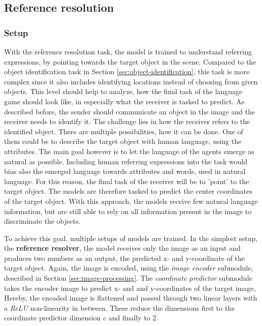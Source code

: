 \subsection{Reference resolution}
\label{sec:reference_resolution}
\subsubsection*{Setup}
With the reference resolution task, the model is trained to understand referring expressions, by pointing towards the target object in the scene.
Compared to the object identification task in Section \ref{sec:object-identification}, this task is more complex since it also includes identifying locations instead of choosing from given objects.
This level should help to analyze, how the final task of the language game should look like, in especially what the receiver is tasked to predict.
As described before, the sender should communicate an object in the image and the receiver needs to identify it.
The challenge lies in how the receiver refers to the identified object.
There are multiple possibilities, how it can be done.
One of them could be to describe the target object with human language, using the attributes.
The main goal however is to let the language of the agents emerge as natural as possible.
Including human referring expressions into the task would bias also the emerged language towards attributes and words, used in natural language.
For this reason, the final task of the receiver will be to 'point' to the target object.
The models are therefore tasked to predict the center coordinates of the target object.
With this approach, the models receive few natural language information, but are still able to rely on all information present in the image to discriminate the objects.

To achieve this goal, multiple setups of models are trained.
In the simplest setup, the \textbf{reference resolver}, the model receives only the image as an input and produces two numbers as an output, the predicted x- and y-coordinate of the target object.
Again, the image is encoded, using the \emph{image encoder} submodule, described in Section \ref{sec:image-processing}.
The \emph{coordinate predictor} submodule takes the encoder image to predict x- and and y-coordinates of the target image,
Hereby, the encoded image is flattened and passed through two linear layers with a \emph{ReLU} non-linearity in between.
These reduce the dimensions first to the coordinate predictor dimension $c$ and finally to 2.

